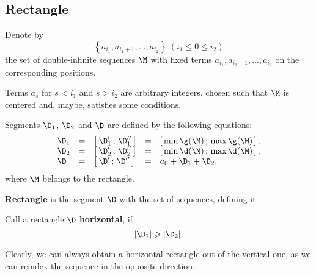 \subsection{Rectangle}

\begin{designation}
	Denote by
	\begin{equation*}%
		\left\{ a_{i_1}, a_{i_1 + 1}, ..., a_{i_2} \right\}
		\;(i_1 \leqslant 0 \leqslant i_2)
	\end{equation*}
	the set of double-infinite sequences $\M$
	with fixed terms $a_{i_1}, a_{i_1 + 1}, ..., a_{i_2}$
	on the corresponding positions.
	
	Terms $a_s$ for $s < i_1$ and $s > i_2$ are arbitrary integers,
	chosen such that $\M$ is centered and, maybe, satisfies some conditions.
\end{designation}

Segments $\D_1$, $\D_2$ and $\D$
are defined by the following equations:
\begin{equation}\label{deltas}
	\begin{array}{lclcl}
		\D_1 & = & \left[\, \D_1' \,;\, \D_1'' \, \right]
		& = & \left[\, \min\g( \M) \,;\,
		\max\g( \M) \, \right],
		\\
		\D_2 & = & \left[\, \D_2' \,;\, \D_2'' \, \right]
		& = & \left[\, \min\d( \M) \,;\,
		\max\d(\M) \, \right],
		\\
		\D & = & \left[\, \D' \,;\, \D'' \, \right]
		& = & a_0 + \D_1 + \D_2,
	\end{array}
\end{equation}
where $\M$ belongs to the rectangle.

\begin{definition}
	\textbf{Rectangle} is the segment $\D$ with the set of sequences, defining it.
\end{definition}

\begin{definition}
	Call a rectangle $\D$ \textbf{horizontal}, if
	\begin{equation}
		\label{d1>d2}
		|\D_1| \geqslant |\D_2|.
	\end{equation}
\end{definition}

Clearly, we can always obtain a horizontal rectangle out of the vertical one,
as we can reindex the sequence in the opposite direction.
